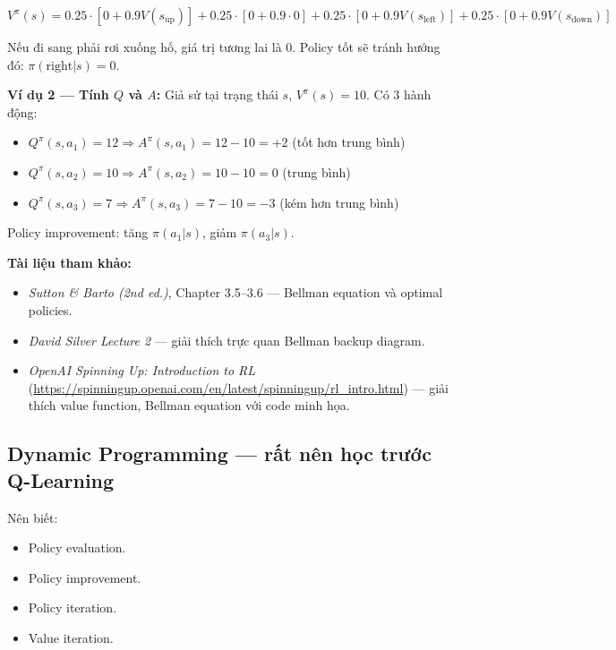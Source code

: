 \documentclass[12pt,a4paper]{article}
\begin{document}
\begin{equation}
V^\pi(s) = 0.25 \cdot [0 + 0.9 V(s_{\text{up}})] + 0.25 \cdot [0 + 0.9 \cdot 0] + 0.25 \cdot [0 + 0.9 V(s_{\text{left}})] + 0.25 \cdot [0 + 0.9 V(s_{\text{down}})]
\end{equation}

Nếu đi sang phải rơi xuống hố, giá trị tương lai là $0$. Policy tốt sẽ tránh hướng đó: $\pi(\text{right}|s)=0$.

\textbf{Ví dụ 2 --- Tính $Q$ và $A$:} Giả sử tại trạng thái $s$, $V^\pi(s)=10$. Có 3 hành động:
\begin{itemize}[leftmargin=1.5em]
    \item $Q^\pi(s, a_1) = 12 \Rightarrow A^\pi(s,a_1) = 12-10 = +2$ (tốt hơn trung bình)
    \item $Q^\pi(s, a_2) = 10 \Rightarrow A^\pi(s,a_2) = 10-10 = 0$ (trung bình)
    \item $Q^\pi(s, a_3) = 7 \Rightarrow A^\pi(s,a_3) = 7-10 = -3$ (kém hơn trung bình)
\end{itemize}

Policy improvement: tăng $\pi(a_1|s)$, giảm $\pi(a_3|s)$.

\textbf{Tài liệu tham khảo:}
\begin{itemize}[leftmargin=1.5em]
    \item \textit{Sutton \& Barto (2nd ed.)}, Chapter 3.5--3.6 --- Bellman equation và optimal policies.
    \item \textit{David Silver Lecture 2} --- giải thích trực quan Bellman backup diagram.
    \item \textit{OpenAI Spinning Up: Introduction to RL} (\url{https://spinningup.openai.com/en/latest/spinningup/rl_intro.html}) --- giải thích value function, Bellman equation với code minh họa.
\end{itemize}

\subsection{Dynamic Programming --- rất nên học trước Q-Learning}

Nên biết:

\begin{itemize}[leftmargin=1.5em]
    \item Policy evaluation.
    \item Policy improvement.
    \item Policy iteration.
    \item Value iteration.
\end{itemize}
\end{document}
